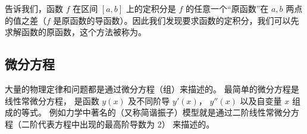 告诉我们，函数 $f$ 在区间 $[a, b]$ 上的定积分是 $f$ 的任意一个“原函数”在 $a, b$ 两点的值之差（$f$ 是原函数的导函数）。因此我们发现要求函数的定积分，我们可以先求解函数的原函数，这个方法被称为。

\subsection{微分方程}
大量的物理定律和问题都是通过微分方程（组）来描述的。 最简单的微分方程是线性常微分方程，%
是函数 $y(x)$ 及不同阶导 $y'(x)$， $y''(x)$ 以及自变量 $x$ 组成的等式。 例如力学中著名的（又称简谐振子）模型就是通过二阶线性常微分方程（二阶代表方程中出现的最高阶导数为 2） 来描述的。



